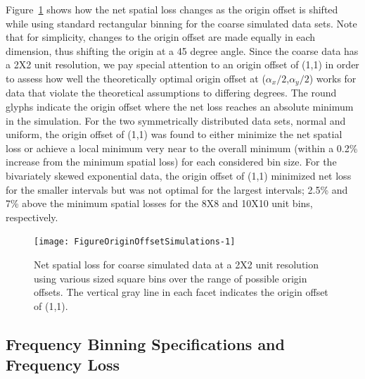 \documentclass[11pt]{isuthesis}\usepackage[]{graphicx}\usepackage[]{color}
\newenvironment{knitrout}{}{} %
\begin{document}
Figure~\ref{fig:OriginOffsetSimulations} shows how the net spatial loss changes as the origin offset is shifted while using standard rectangular binning for the coarse simulated data sets. Note that for simplicity, changes to the origin offset are made equally in each dimension, thus shifting the origin at a 45 degree angle. Since the coarse data has a 2X2 unit resolution, we pay special attention to an origin offset of (1,1) in order to assess how well the theoretically optimal origin offset at ($\alpha_x/2$,$\alpha_y/2$) works for data that violate the theoretical assumptions to differing degrees. The round glyphs indicate the origin offset where the net loss reaches an absolute minimum in the simulation. For the two symmetrically distributed data sets, normal and uniform, the origin offset of (1,1) was found to either minimize the net spatial loss or achieve a local minimum very near to the overall minimum (within a 0.2\% increase from the minimum spatial loss) for each considered bin size. For the bivariately skewed exponential data, the origin offset of (1,1) minimized net loss for the smaller intervals but was not optimal for the largest intervals; 2.5\% and 7\% above the minimum spatial losses for the 8X8 and 10X10 unit bins, respectively.

\begin{knitrout}
\color{fgcolor}\begin{figure}[h]

{\centering \texttt{[image: FigureOriginOffsetSimulations-1]} 

}

\caption[Net spatial loss for coarse simulated data at a 2X2 unit resolution using various sized square bins over the range of possible origin offsets]{Net spatial loss for coarse simulated data at a 2X2 unit resolution using various sized square bins over the range of possible origin offsets. The vertical gray line in each facet indicates the origin offset of (1,1).}\label{fig:OriginOffsetSimulations}
\end{figure}


\end{knitrout}


\subsection{Frequency Binning Specifications and Frequency Loss}
\label{FreqBinningSpec}
\end{document}
